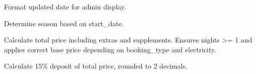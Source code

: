\documentclass[letterpaper,10pt,english]{sphinxmanual}
\begin{document}
\begin{fulllineitems}
\begin{fulllineitems}
\label{\detokenize{index:bookings.models.Booking.updated_at_display}}
\pysigstartsignatures
\pysiglinewithargsret
{}
{}
{}
\pysigstopsignatures
\sphinxAtStartPar
Format updated date for admin display.

\end{fulllineitems}


\begin{fulllineitems}
\label{\detokenize{index:bookings.models.Booking.get_season}}
\pysigstartsignatures
\pysiglinewithargsret
{}
{}
{}
\pysigstopsignatures
\sphinxAtStartPar
Determine season based on start\_date.

\end{fulllineitems}


\begin{fulllineitems}
\label{\detokenize{index:bookings.models.Booking.calculate_total_price}}
\pysigstartsignatures
\pysiglinewithargsret
{}
{}
{}
\pysigstopsignatures
\sphinxAtStartPar
Calculate total price including extras and supplements.
Ensures nights \textgreater{}= 1 and applies correct base price depending on booking\_type and electricity.

\end{fulllineitems}


\begin{fulllineitems}
\label{\detokenize{index:bookings.models.Booking.calculate_deposit}}
\pysigstartsignatures
\pysiglinewithargsret
{}
{}
{}
\pysigstopsignatures
\sphinxAtStartPar
Calculate 15\% deposit of total price, rounded to 2 decimals.

\end{fulllineitems}


\end{fulllineitems}
\end{document}
